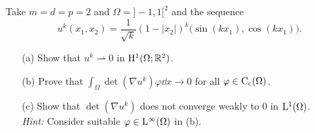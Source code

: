 \documentclass[12pt,a4paper]{article}
\begin{document}
Take $m=d=p=2$ and $\Omega ={]-1,1[}^2$ and the sequence
\[
u^k(x_1,x_2)=\frac1{\sqrt{k}} (1{-}|x_2|)^k \big( \sin(kx_1), \cos(kx_1)\big).
\]
\begin{itemize}
\item[(a)] Show that $u^k \rightharpoonup 0$ in ${\mathrm H}^1(\Omega;{\mathbb R}^2)$.
\item[(b)] Prove that $\int_\Omega \det (\nabla u^k) \varphi \dd x \to 0$ 
for all $\varphi \in {\mathrm C}_{\mathrm c}(\Omega)$.
\item[(c)] Show that $\det (\nabla u^k)$ does not converge weakly to $0$ in
${\mathrm L}^1(\Omega)$. 
\\
\textit{Hint:} Consider suitable $\varphi\in
  {\mathrm L}^\infty(\Omega)$ in (b).
\end{itemize}
\end{document}
